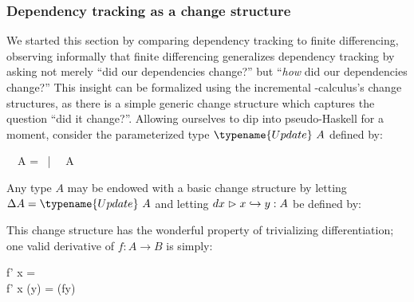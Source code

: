 


\subsubsection{Dependency tracking as a change structure}

We started this section by comparing dependency tracking to finite differencing,
observing informally that finite differencing generalizes dependency tracking by
asking not merely ``did our dependencies change?'' but ``\emph{how} did our
dependencies change?'' This insight can be formalized using the incremental
\fn-calculus's change structures, as there is a simple generic change structure
which captures the question ``did it change?''. Allowing ourselves to dip into
pseudo-Haskell for a moment, consider the parameterized type
$\typename{Update}~A$ defined by:

\begin{code}
  ~~A
  =  ~|~ ~A
\end{code}

\noindent
Any type $A$ may be endowed with a basic change structure by letting $\Delta A = \typename{Update}~A$ and letting $\gvalid{A}{dx} x y$ be defined by:
%
\begin{mathpar}

\end{mathpar}

\noindent
This change structure has the wonderful property of trivializing differentiation; one valid derivative of $f : A \to B$ is simply:

\begin{code}
  f' \<x \< = \\
  f' \<x \<(\<y) =  \<(f\<y)
\end{code}

